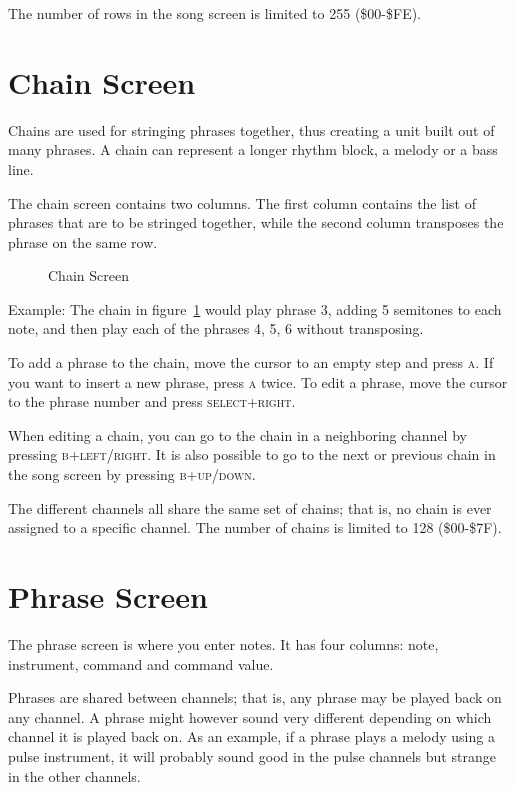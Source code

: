 The number of rows in the song screen is limited to 255 (\$00-\$FE).

\section{Chain Screen}
Chains are used for stringing phrases together, thus creating a unit built out of many
phrases. A chain can represent a longer rhythm block, a melody or a bass line.

The chain screen contains two columns. The first column contains the list of phrases that are
to be stringed together, while the second column transposes the phrase on the same row.

\begin{figure}[hbtp]
\centering
{}
\caption{Chain Screen}
\label{fig:chainexample}
\end{figure}

Example:
The chain in figure~\ref{fig:chainexample} would play phrase 3, adding 5 semitones to each note, and then play each of the phrases 4, 5, 6 without transposing.

To add a phrase to the chain, move the cursor to an empty step and press \textsc{a}. If you want to
insert a new phrase, press \textsc{a} twice. To edit a phrase, move the cursor to the phrase number
and press \textsc{select+right}.

When editing a chain, you can go to the chain in a neighboring channel by pressing \textsc{b+left/right}. It is also possible to go to the next or previous chain in the song screen by
pressing \textsc{b+up/down}.

The different channels all share the same set of chains; that is, no chain is ever assigned to a
specific channel. The number of chains is limited to 128 (\$00-\$7F).

\section{Phrase Screen}

\begin{figure}[hbtp]
\centering
{}
\end{figure}

The phrase screen is where you enter notes. It has four columns: note, instrument, command and command value.

Phrases are shared between channels; that is, any phrase may be played back on any channel. A phrase might however sound very different depending on which channel it is played back on. As an example, if a phrase plays a melody using a pulse instrument, it will probably sound good in the pulse channels but strange in the other channels.

